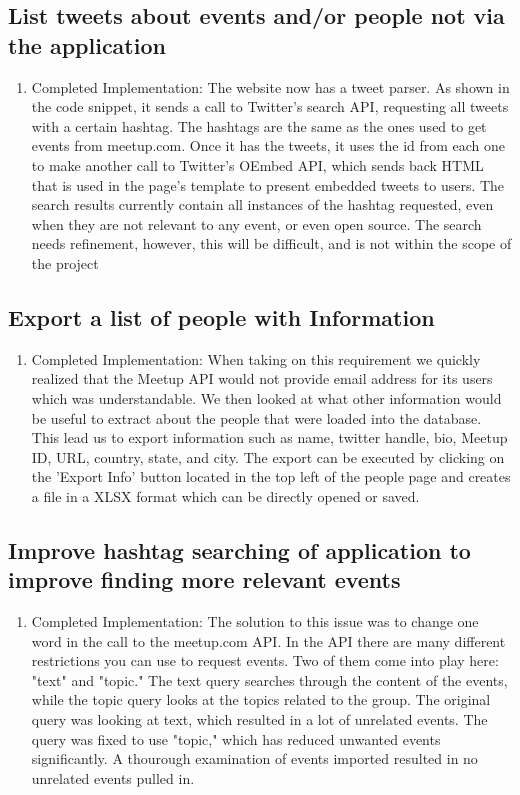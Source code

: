 \documentclass[draftclsnofoot,10pt,onecolumn]{IEEEtran} %
\begin{document}
\begin{enumerate}
\subsection{List tweets about events and/or people not via the application}
\begin{enumerate}
  \item Completed Implementation: The website now has a tweet parser. As shown
    in the code snippet, it sends a call to Twitter's search API, requesting all
    tweets with a certain hashtag. The hashtags are the same as the ones used to
    get events from meetup.com. Once it has the tweets, it uses the id from each
    one to make another call to Twitter's OEmbed API, which sends back HTML that
    is used in the page's template to present embedded tweets to users.  The
    search results currently contain all instances of the hashtag requested,
    even when they are not relevant to any event, or even open source. The
    search needs refinement, however, this will be difficult, and is not within
    the scope of the project
\end{enumerate}

\subsection{Export a list of people with Information}
\begin{enumerate}
  \item Completed Implementation: When taking on this requirement we quickly realized that
    the Meetup API would not provide email address for its users which was
    understandable. We then looked at what other information would be useful to
    extract about the people that were loaded into the database. This lead us to
    export information such as name, twitter handle, bio, Meetup ID, URL, country,
    state, and city. The export can be executed by clicking on the 'Export Info'
    button located in the top left of the people page and creates a file in a XLSX
    format which can be directly opened or saved.
    
\end{enumerate}

\subsection{Improve hashtag searching of application to improve finding more relevant events}
\begin{enumerate}
  \item Completed Implementation: The solution to this issue was to change one word in
    the call to the meetup.com API. In the API there are many different
    restrictions you can use to request events. Two of them come into play here:
    "text" and "topic." The text query searches through the content of the
    events, while the topic query looks at the topics related to the group. The
    original query was looking at text, which resulted in a lot of unrelated
    events. The query was fixed to use "topic," which has reduced unwanted events
    significantly. A thourough examination of events imported resulted in no
    unrelated events pulled in.
\end{enumerate}


\end{enumerate}
\end{document}
